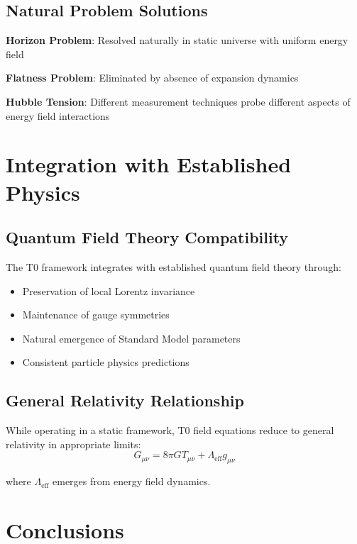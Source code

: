 \documentclass[12pt,a4paper]{article}
\begin{document}
	\subsection{Natural Problem Solutions}
	\label{subsec:natural_solutions}
	
	\textbf{Horizon Problem}: Resolved naturally in static universe with uniform energy field
	
	\textbf{Flatness Problem}: Eliminated by absence of expansion dynamics
	
	\textbf{Hubble Tension}: Different measurement techniques probe different aspects of energy field interactions
	
	\section{Integration with Established Physics}
	\label{sec:established_integration}
	
	\subsection{Quantum Field Theory Compatibility}
	\label{subsec:qft_compatibility}
	
	The T0 framework integrates with established quantum field theory through:
	\begin{itemize}
		\item Preservation of local Lorentz invariance
		\item Maintenance of gauge symmetries
		\item Natural emergence of Standard Model parameters
		\item Consistent particle physics predictions
	\end{itemize}
	
	\subsection{General Relativity Relationship}
	\label{subsec:gr_relationship}
	
	While operating in a static framework, T0 field equations reduce to general relativity in appropriate limits:
	\begin{equation}
		G_{\mu\nu} = 8\pi G T_{\mu\nu} + \Lambda_{\text{eff}} g_{\mu\nu}
	\end{equation}
	
	where $\Lambda_{\text{eff}}$ emerges from energy field dynamics.
	
	\section{Conclusions}
	\label{sec:conclusions}
	
\end{document}
